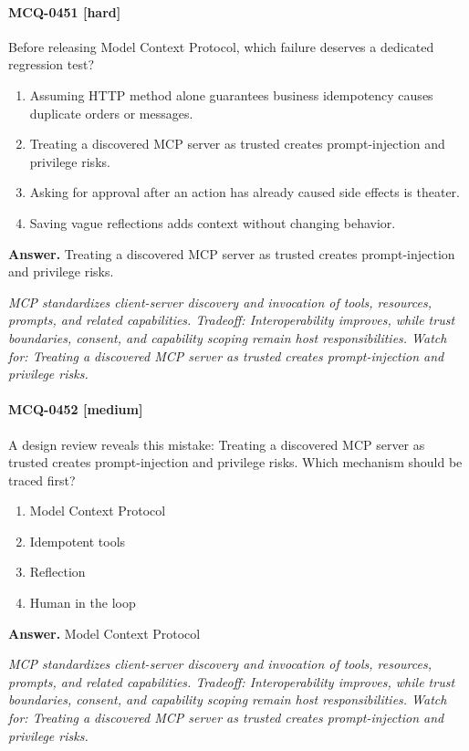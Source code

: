 \paragraph{MCQ-0451 [hard]} Before releasing Model Context Protocol, which failure deserves a dedicated regression test?
\begin{enumerate}[label=\Alph*.]
\item Assuming HTTP method alone guarantees business idempotency causes duplicate orders or messages.
\item Treating a discovered MCP server as trusted creates prompt-injection and privilege risks.
\item Asking for approval after an action has already caused side effects is theater.
\item Saving vague reflections adds context without changing behavior.
\end{enumerate}
\noindent\textbf{Answer.} Treating a discovered MCP server as trusted creates prompt-injection and privilege risks.
\par\textit{MCP standardizes client-server discovery and invocation of tools, resources, prompts, and related capabilities. Tradeoff: Interoperability improves, while trust boundaries, consent, and capability scoping remain host responsibilities. Watch for: Treating a discovered MCP server as trusted creates prompt-injection and privilege risks.}
\paragraph{MCQ-0452 [medium]} A design review reveals this mistake: Treating a discovered MCP server as trusted creates prompt-injection and privilege risks. Which mechanism should be traced first?
\begin{enumerate}[label=\Alph*.]
\item Model Context Protocol
\item Idempotent tools
\item Reflection
\item Human in the loop
\end{enumerate}
\noindent\textbf{Answer.} Model Context Protocol
\par\textit{MCP standardizes client-server discovery and invocation of tools, resources, prompts, and related capabilities. Tradeoff: Interoperability improves, while trust boundaries, consent, and capability scoping remain host responsibilities. Watch for: Treating a discovered MCP server as trusted creates prompt-injection and privilege risks.}
